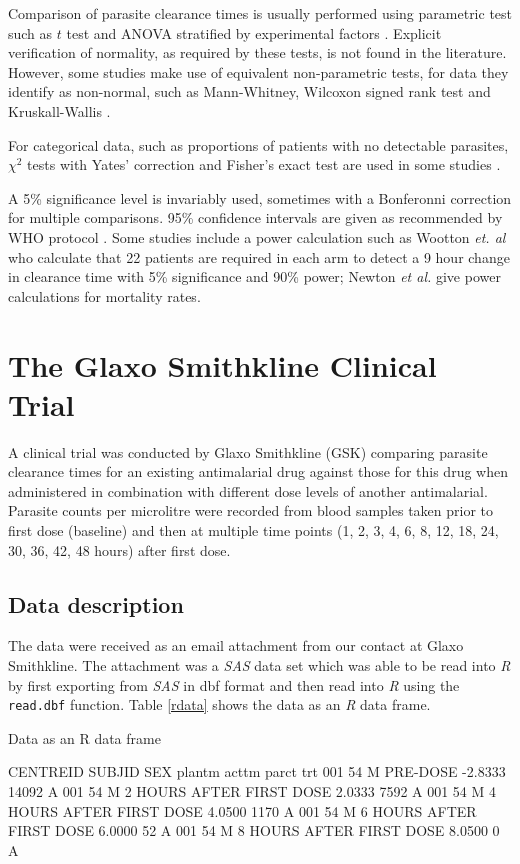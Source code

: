 Comparison of parasite clearance times is usually performed using parametric test such as $t$ test and ANOVA stratified by experimental factors \cite{vries, smithuis, wootton, carmello}. Explicit verification of normality, as required by these tests, is not found in the literature. However, some studies make use of equivalent non-parametric tests, for data they identify as non-normal, such as Mann-Whitney, Wilcoxon signed rank test \cite{carmello, newton} and Kruskall-Wallis \cite{pukri}.\label{stat-tests}

For categorical data, such as proportions of patients with no detectable parasites, $\chi^{2}$ tests with Yates' correction and Fisher's exact test are used in some studies \cite{newton, smithuis}.

A 5\% significance level is invariably used, sometimes with a Bonferonni correction for multiple comparisons. 95\% confidence intervals are given as recommended by WHO protocol \cite{protocolWHO}. Some studies include a power calculation such as Wootton \textit{et. al} \cite{wootton} who calculate that 22 patients are required in each arm to detect a 9 hour change in clearance time with 5\% significance and 90\% power; Newton \textit{et al.} \cite{newton} give power calculations for mortality rates.
\section{The Glaxo Smithkline Clinical Trial}
A clinical trial was conducted by Glaxo Smithkline (GSK) comparing parasite clearance times for an existing antimalarial drug against those for this drug when administered in combination with different dose levels of another antimalarial. Parasite counts per microlitre were recorded from blood samples taken prior to first dose (baseline) and then at multiple time points (1, 2, 3, 4, 6, 8, 12, 18, 24, 30, 36, 42, 48 hours) after first dose.

\subsection{Data description}
The data were received as an email attachment from our contact at Glaxo Smithkline. The attachment was a \emph{SAS} data set which was able to be read into \emph{R} by first exporting from \emph{SAS} in dbf format and then read into \emph{R} using the \texttt{read.dbf} function.
Table \ref{rdata} shows the data as an \emph{R} data frame. 
\begin{table}[h]
\centering
\caption{Data as an R data frame}\label{rdata}
\begin{boxedverbatim}
CENTREID SUBJID SEX                    plantm   acttm  parct trt
     001     54   M                  PRE-DOSE -2.8333  14092   A  
     001     54   M  2 HOURS AFTER FIRST DOSE  2.0333   7592   A  
     001     54   M  4 HOURS AFTER FIRST DOSE  4.0500   1170   A  
     001     54   M  6 HOURS AFTER FIRST DOSE  6.0000     52   A  
     001     54   M  8 HOURS AFTER FIRST DOSE  8.0500      0   A  
\end{boxedverbatim}
\end{table}

